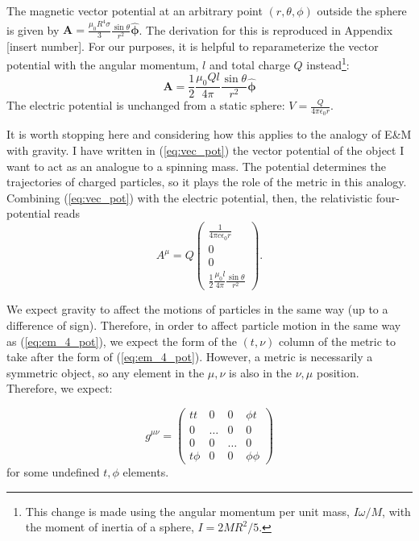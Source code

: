 \documentclass[11pt]{article}
\begin{document}
 The magnetic vector potential at an arbitrary point $(r,\theta,\phi)$ outside the sphere is given by $\mathbf{A} = \frac{\mu_0R^4\sigma}{3}\frac{\sin\theta}{r^2}\mathbf{\hat{\phi}}$.  The derivation for this is reproduced in Appendix [insert number].  For our purposes, it is helpful to reparameterize the vector potential with the angular momentum, $l$ and total charge $Q$ instead\footnote{This change is made using the angular momentum per unit mass, $I\omega/M$, with the moment of inertia of a sphere, $I = 2MR^2/5$.}:
 \begin{equation}\label{eq:vec_pot}
 \mathbf{A} = \frac{1}{2}\frac{\mu_0 Q l}{4\pi}\frac{\sin\theta}{r^2}\mathbf{\hat{\phi}}
 \end{equation}
The electric potential is unchanged from a static sphere: $V = \frac{Q}{4\pi\epsilon_0r}$.

It is worth stopping here and considering how this applies to the analogy of E\&M with gravity.  I have written in (\ref{eq:vec_pot}) the vector potential of the object I want to act as an analogue to a spinning mass.  The potential determines the trajectories of charged particles, so it plays the role of the metric in this analogy.  Combining (\ref{eq:vec_pot}) with the electric potential, then, the relativistic four-potential reads
\begin{equation}\label{eq:em_4_pot}
A^\mu = Q\left(
\begin{array}{c}
\frac{1}{4\pi c\epsilon_0r}\\
0\\
0\\
\frac{1}{2}\frac{\mu_0  l}{4\pi}\frac{\sin\theta}{r^2}
\end{array}
\right).
\end{equation}

We expect gravity to affect the motions of particles in the same way (up to a difference of sign).  Therefore, in order to affect particle motion in the same way as (\ref{eq:em_4_pot}), we expect the form of the $(t,\nu)$ column of the metric to take after the form of  (\ref{eq:em_4_pot}).  However, a metric is necessarily a symmetric object, so any element in the $\mu,\nu$ is also in the $\nu,\mu$ position.  Therefore, we expect:

\begin{equation}\label{eq:rough_metric}
g^{\mu\nu} =
\left(
\begin{array}{cccc}
t t &0 &0 &\phi t\\
0 &\dots&0&0\\
0&0&\dots&0\\
t \phi&0&0&\phi\phi
\end{array}
\right)
\end{equation}
for some undefined $t,\phi$ elements.
\end{document}
